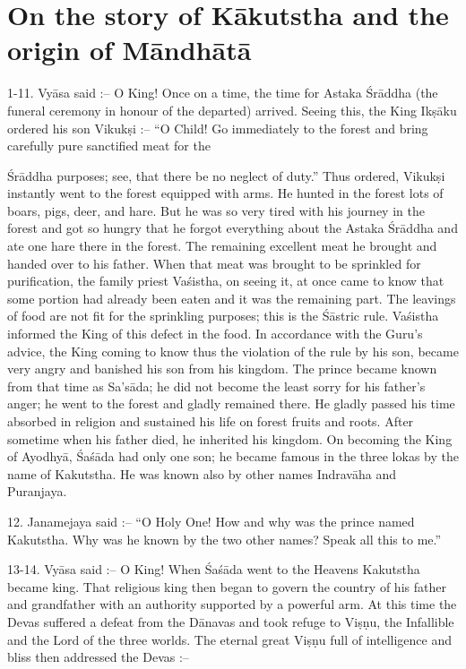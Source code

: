 \chapter{On the story of K\=akutstha and the origin of M\=andh\=at\=a}

1-11. Vy\=asa said :-- O King! Once on a time, the time for Astaka \'Sr\=addha (the funeral ceremony in honour of the departed) arrived. Seeing this, the King Ik\d{s}\=aku ordered his son Vikuk\d{s}i :-- ``O Child! Go immediately to the forest and bring carefully pure sanctified meat for the

\'Sr\=addha purposes; see, that there be no neglect of duty.'' Thus ordered, Vikuk\d{s}i instantly went to the forest equipped with arms. He hunted in the forest lots of boars, pigs, deer, and hare. But he was so very tired with his journey in the forest and got so hungry that he forgot everything about the Astaka \'Sr\=addha and ate one hare there in the forest. The remaining excellent meat he brought and handed over to his father. When that meat was brought to be sprinkled for purification, the family priest Va\'sistha, on seeing it, at once came to know that some portion had already been eaten and it was the remaining part. The leavings of food are not fit for the sprinkling purposes; this is the \'S\=astric rule. Va\'sistha informed the King of this defect in the food. In accordance with the Guru's advice, the King coming to know thus the violation of the rule by his son, became very angry and banished his son from his kingdom. The prince became known from that time as Sa's\=ada; he did not become the least sorry for his father's anger; he went to the forest and gladly remained there. He gladly passed his time absorbed in religion and sustained his life on forest fruits and roots. After sometime when his father died, he inherited his kingdom. On becoming the King of Ayodhy\=a, \'Sa\'s\=ada had only one son; he became famous in the three lokas by the name of Kakutstha. He was known also by other names Indrav\=aha and Puranjaya.

12. Janamejaya said :-- ``O Holy One! How and why was the prince named Kakutstha. Why was he known by the two other names? Speak all this to me.''

13-14. Vy\=asa said :-- O King! When \'Sa\'s\=ada went to the Heavens Kakutstha became king. That religious king then began to govern the country of his father and grandfather with an authority supported by a powerful arm. At this time the Devas suffered a defeat from the D\=anavas and took refuge to Vi\d{s}\d{n}u, the Infallible and the Lord of the three worlds. The eternal great Vi\d{s}\d{n}u full of intelligence and bliss then addressed the Devas :--

